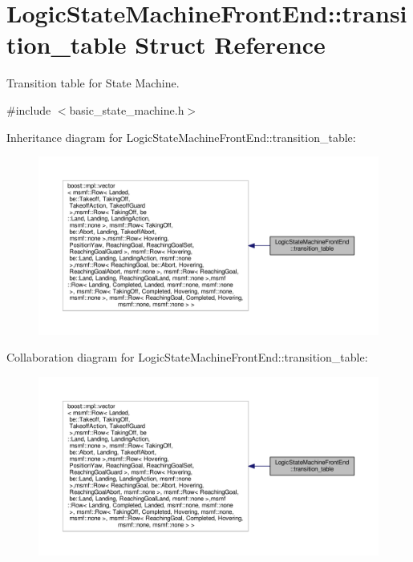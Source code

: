 \hypertarget{structLogicStateMachineFrontEnd_1_1transition__table}{\section{Logic\-State\-Machine\-Front\-End\-:\-:transition\-\_\-table Struct Reference}
\label{structLogicStateMachineFrontEnd_1_1transition__table}
}


Transition table for State Machine.  




{\ttfamily \#include $<$basic\-\_\-state\-\_\-machine.\-h$>$}



Inheritance diagram for Logic\-State\-Machine\-Front\-End\-:\-:transition\-\_\-table\-:\nopagebreak
\begin{figure}[H]
\begin{center}
\leavevmode
\includegraphics[width=350pt]{structLogicStateMachineFrontEnd_1_1transition__table__inherit__graph}
\end{center}
\end{figure}


Collaboration diagram for Logic\-State\-Machine\-Front\-End\-:\-:transition\-\_\-table\-:\nopagebreak
\begin{figure}[H]
\begin{center}
\leavevmode
\includegraphics[width=350pt]{structLogicStateMachineFrontEnd_1_1transition__table__coll__graph}
\end{center}
\end{figure}


